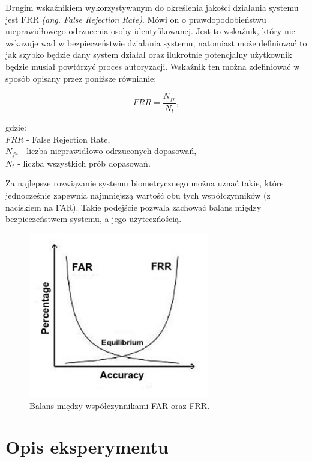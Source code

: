 Drugim wska\'znikiem wykorzystywanym do określenia jakości działania systemu jest FRR \textit{(ang. False Rejection Rate)}.
Mówi on o prawdopodobieństwu nieprawidłowego odrzucenia osoby identyfikowanej. Jest to wska\'znik, który
nie wskazuje wad w bezpieczeństwie działania systemu, natomiast może definiowa\'c to jak
szybko będzie dany system działał oraz ilukrotnie potencjalny użytkownik będzie musiał powtórzy\'c
proces autoryzacji. Wska\'znik ten można zdefiniowa\'c w sposób opisany przez poniższe równianie:

\begin{equation}
  \mathit{FRR} = \frac{N_{\mathit{fr}}}{N_{t}},
\end{equation}

\noindent
gdzie:\\
\indent $\mathit{FRR}$ - False Rejection Rate,\\
\indent $N_{\mathit{fr}}$ - liczba nieprawidłowo odrzuconych dopasowań,\\
\indent $N_{t}$ - liczba wszystkich prób dopasowań.\newline

Za najlepsze rozwiązanie systemu biometrycznego można uzna\'c takie, które jednocześnie zapewnia
najmniejszą wartoś\'c obu tych współczynników (z naciskiem na FAR). Takie podejście pozwala zachowa\'c balans między bezpieczeństwem
systemu, a jego użyteczńością.

\begin{figure}[ht]
  \centering
  \includegraphics[width=0.7\textwidth]{images/experiment/frrfardiagram.jpg}
  \caption{Balans między współczynnikami FAR oraz FRR.}
\end{figure}

\section{Opis eksperymentu}

